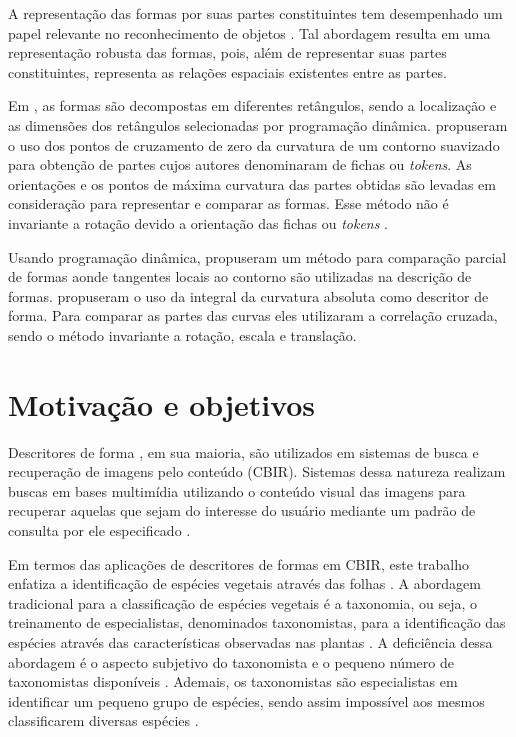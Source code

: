A representação das formas por suas partes constituintes tem desempenhado um papel relevante no reconhecimento de objetos \cite{Ullman:1996}. Tal abordagem resulta em uma representação robusta das formas, pois, além de representar suas partes constituintes, representa as relações espaciais existentes entre as partes.  

Em , as formas são decompostas em diferentes retângulos, sendo a localização e as dimensões dos retângulos selecionadas por programação dinâmica.  propuseram o uso dos pontos de cruzamento de zero da curvatura de um contorno suavizado para obtenção de partes cujos autores denominaram de fichas ou \textit{tokens}. As orientações e os pontos de máxima curvatura das partes obtidas são levadas em consideração para representar e comparar as formas. Esse método não é invariante a rotação devido a orientação das fichas ou \textit{tokens} \cite{DiRuberto:2009}. 

Usando programação dinâmica,  propuseram um método para comparação parcial de formas aonde tangentes locais ao contorno são utilizadas na descrição de formas.  propuseram o uso da integral da curvatura absoluta como descritor de forma. Para comparar as partes das curvas eles utilizaram a correlação cruzada, sendo o método invariante a rotação, escala e translação.  

\section{Motivação e objetivos \label{sec:motiv_obj}}

Descritores de forma \cite{Belongie:2002, 1467513, Latecki:2007, Nanni20122254, Hu20123348, Wang2012134}, em sua maioria, são utilizados em sistemas de busca e recuperação de imagens pelo conteúdo (\ac{CBIR}). Sistemas dessa natureza realizam buscas em bases multimídia utilizando o conteúdo visual das imagens para recuperar aquelas que sejam do interesse do usuário mediante um padrão de consulta por ele especificado \cite{Feng:2003}. 

Em termos das aplicações de descritores de formas em \ac{CBIR}, este trabalho enfatiza a identificação de espécies vegetais através das folhas \cite{Wang:2000, Nam2008245, Fotopoulou:2013, Zhao20153203,  deSouza2016}. A abordagem tradicional para a classificação de espécies vegetais é a taxonomia, ou seja, o treinamento de especialistas, denominados taxonomistas, para a identificação das espécies através das características observadas nas plantas \cite{Cope20127562}. A deficiência dessa abordagem é o aspecto subjetivo do taxonomista \cite{JVS:JVS1441} e o pequeno número de taxonomistas disponíveis \cite{Cope20127562}. Ademais, os taxonomistas são especialistas em identificar um pequeno grupo de espécies, sendo assim impossível aos mesmos classificarem diversas espécies \cite{Cope20127562}.

